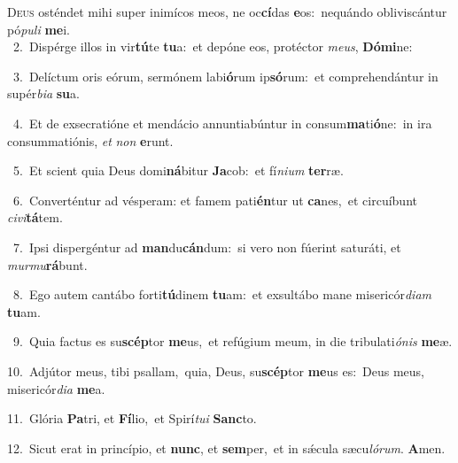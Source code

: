 \lettrine{\initial\textcolor{\initialcolor}{D}}{eus} osténdet mihi super inimícos meos, ne oc\-\textbf{cí}\-das \textbf{e}\-os:~\star nequándo obliviscántur pó\-\textit{pu}\-\textit{li} \textbf{me}\-i.\\
{\numbfont\textcolor{\numbcolor}{~2.}}~Dispérge illos in vir\-\textbf{tú}\-te \textbf{tu}\-a:~\star et depóne eos, protéctor \textit{me}\-\textit{us}, \textbf{Dó}\-\textbf{mi}ne:\par
{\numbfont\textcolor{\numbcolor}{~3.}}~Delíctum oris eórum, sermónem labi\-\textbf{ó}\-rum ip\-\textbf{só}\-rum:~\star et comprehendántur in supér\-\textit{bi}\-\textit{a} \textbf{su}\-a.\par
{\numbfont\textcolor{\numbcolor}{~4.}}~Et de exsecratióne et mendácio annuntiabúntur in consum\-\textbf{ma}\-ti\-\textbf{ó}\-ne:~\star in ira consummatiónis, \textit{et} \textit{non} \textbf{e}\-runt.\par
{\numbfont\textcolor{\numbcolor}{~5.}}~Et scient quia Deus domi\-\textbf{ná}\-bitur \textbf{Ja}\-cob:~\star et fí\-\textit{ni}\-\textit{um} \textbf{ter}\-ræ.\par
{\numbfont\textcolor{\numbcolor}{~6.}}~Converténtur ad vésperam: et famem pati\-\textbf{én}\-tur ut \textbf{ca}\-nes,~\star et circuíbunt \textit{ci}\-\textit{vi}\textbf{tá}tem.\par
{\numbfont\textcolor{\numbcolor}{~7.}}~Ipsi dispergéntur ad \textbf{man}\-du\-\textbf{cán}\-dum:~\star si vero non fúerint saturáti, et \textit{mur}\-\textit{mu}\textbf{rá}bunt.\par
{\numbfont\textcolor{\numbcolor}{~8.}}~Ego autem cantábo forti\-\textbf{tú}\-dinem \textbf{tu}\-am:~\star et exsultábo mane misericór\-\textit{di}\-\textit{am} \textbf{tu}\-am.\par
{\numbfont\textcolor{\numbcolor}{~9.}}~Quia factus es su\-\textbf{scép}\-tor \textbf{me}\-us,~\star et refúgium meum, in die tribulati\-\textit{ó}\-\textit{nis} \textbf{me}\-æ.\par
{\numbfont\textcolor{\numbcolor}{10.}}~Adjútor meus, tibi psallam,~\dagger quia, Deus, su\-\textbf{scép}\-tor \textbf{me}\-us es:~\star Deus meus, misericór\-\textit{di}\-\textit{a} \textbf{me}\-a.\par
{\numbfont\textcolor{\numbcolor}{11.}}~Glória \textbf{Pa}\-tri, et \textbf{Fí}\-lio,~\star et Spirí\-\textit{tu}\-\textit{i} \textbf{Sanc}\-to.\par
{\numbfont\textcolor{\numbcolor}{12.}}~Sicut erat in princípio, et \textbf{nunc}\-, et \textbf{sem}\-per,~\star et in sǽcula sæcu\-\textit{ló}\-\textit{rum}. \textbf{A}\-men.\par
